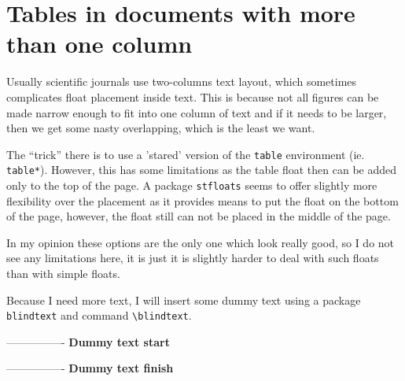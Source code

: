 


\section{Tables in documents with more than one column}

\begin{multicols}{2}
        

            Usually scientific journals use two-columns text layout, which sometimes
                complicates float placement inside text. This is because not all figures can
                    be made narrow enough to fit into one column of text and if it needs to be
                        larger, then we get some nasty overlapping, which is the least we want.

                            The ``trick'' there is to use a 'stared' version of the \verb|table|
                                environment (ie. \verb|table*|). However, this has some limitations as the
                                    table float then can be added only to the top of the page. A package
                                        \verb|stfloats| seems to offer slightly more flexibility over the placement
                                            as it provides means to put the float on the bottom of the page, however,
                                                the float still can not be placed in the middle of the page.

                                                    In my opinion these options are the only one which look really good, so I do
                                                        not see any limitations here, it is just it is slightly harder to deal with
                                                            such floats than with simple floats.

                                                                Because I need more text, I will insert some dummy text using a package
                                                                    \verb|blindtext| and command \verb|\blindtext|.

                                                                        ----------------
                                                                            \textbf{Dummy text start}

                                                                                \blindtext

                                                                                    \blindtext

                                                                                        ----------------
                                                                                            \textbf{Dummy text finish}
                                                                                        \end{multicols}

